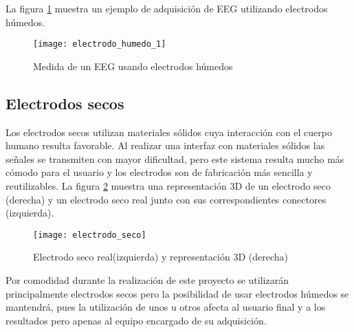 La figura \ref{fig:electrodo_humedo_1} muestra un ejemplo de adquisición de \acrshort{EEG} utilizando electrodos húmedos.

\begin{figure} [h]
    \centering
    \texttt{[image: electrodo\_humedo\_1]}
    \caption{Medida de un EEG usando electrodos húmedos \cite{apuntes}}
    \label{fig:electrodo_humedo_1}
\end{figure}

\clearpage

\subsection{Electrodos secos\label{sec:Elec_secos}}

Los electrodos secos utilizan materiales sólidos cuya interacción con el cuerpo humano resulta favorable. Al realizar una interfaz con materiales sólidos las señales se transmiten con mayor dificultad, pero este sistema resulta mucho más cómodo para el usuario y los electrodos son de fabricación más sencilla y reutilizables. La figura \ref{fig:electrodo_seco} muestra una representación 3D de un electrodo seco (derecha) y un electrodo seco real junto con sus correspondientes conectores (izquierda).

\begin{figure} [h]
    \centering
    \texttt{[image: electrodo\_seco]}
    \caption{Electrodo seco real(izquierda) y representación 3D (derecha) \cite{apuntes}}
    \label{fig:electrodo_seco}
\end{figure}

Por comodidad durante la realización de este proyecto se utilizarán principalmente electrodos secos pero la posibilidad de usar electrodos húmedos se mantendrá, pues la utilización de unos u otros afecta al usuario final y a los resultados pero apenas al equipo encargado de su adquisición.
